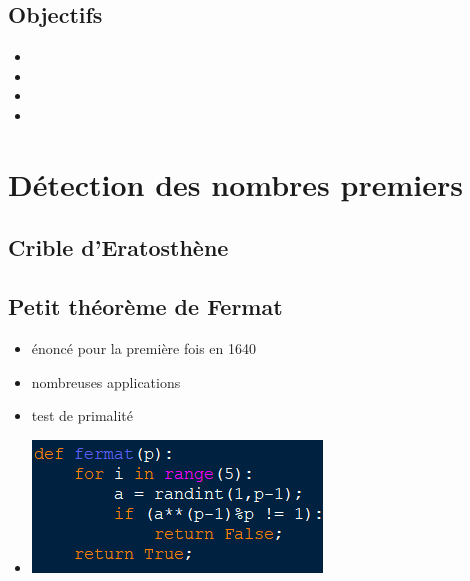 \documentclass{beamer}
\begin{document}
\subsection{Objectifs}
\begin{frame}
\begin{itemize}
\item 
\item 
\item 
\item 
\end{itemize}
\end{frame}

\section{Détection des nombres premiers}
\subsection{Crible d'Eratosthène}
\begin{frame}

\end{frame}

\subsection{Petit théorème de Fermat}

\begin{frame}
\begin{itemize}
\item énoncé pour la première fois en 1640
\item nombreuses applications
\end{itemize}
\end{frame}

\begin{frame}
\begin{itemize}
\item[] test de primalité
\item[] \includegraphics[scale=1]{images/fermat_code.png}
\end{itemize}
\end{frame}
\end{document}

